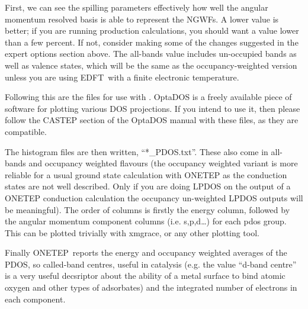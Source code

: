 \documentclass[letterpaper,10pt,english]{sphinxmanual}
\begin{document}
\begin{sphinxVerbatim}[commandchars=\\\{\}]
          
       
\end{sphinxVerbatim}

First, we can see the spilling parameters \textendash{} effectively how well the
angular momentum resolved basis is able to represent the NGWFs. A lower
value is better; if you are running production calculations, you should
want a value lower than a few percent. If not, consider making some of
the changes suggested in the expert options section above. The all-bands
value includes un-occupied bands as well as valence states, which will
be the same as the occupancy-weighted version unless you are using
EDFT with a finite electronic temperature.

Following this are the files for use with . OptaDOS is a
freely available piece of software for plotting various DOS projections.
If you intend to use it, then please follow the CASTEP section of the
OptaDOS manual with these files, as they are compatible.

The histogram files are then written, “*\_PDOS.txt”. These also come in
all-bands and occupancy weighted flavours (the occupancy weighted
variant is more reliable for a usual ground state calculation with
ONETEP as the conduction states are not well described. Only if you are
doing LPDOS on the output of a ONETEP conduction calculation the
occupancy un-weighted LPDOS outputs will be meaningful). The order of
columns is firstly the energy column, followed by the angular momentum
component columns (i.e. s,p,d…) for each pdos group. This can be
plotted trivially with xmgrace, or any other plotting tool.

Finally ONETEP reports the energy and occupancy weighted averages of the
PDOS, so called-band centres, useful in catalysis (e.g. the value
“d-band centre” is a very useful decsriptor about the ability of a metal
surface to bind atomic oxygen and other types of adsorbates) and the
integrated number of electrons in each component.
\end{document}
